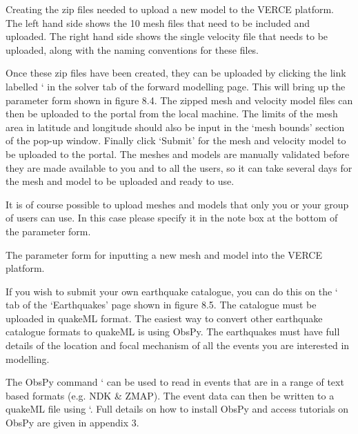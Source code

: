 \documentclass[english]{book}
\begin{document}

 Creating the zip files needed to upload a new model to
the VERCE platform. The left hand side shows the 10 mesh files that need
to be included and uploaded. The right hand side shows the single
velocity file that needs to be uploaded, along with the naming
conventions for these files.

Once these zip files have been created, they can be uploaded by clicking
the link labelled ‘ in the solver tab of the forward modelling page. This will
bring up the parameter form shown in figure 8.4. The zipped mesh and
velocity model files can then be uploaded to the portal from the local
machine. The limits of the mesh area in latitude and longitude should
also be input in the ‘mesh bounds’ section of the pop-up window. Finally
click ‘Submit’ for the mesh and velocity model to be uploaded to the
portal. The meshes and models are manually validated before they are
made available to you and to all the users, so it can take several days
for the mesh and model to be uploaded and ready to use.

It is of course possible to upload meshes and models that only you or
your group of users can use. In this case please specify it in the note
box at the bottom of the parameter form.


 The parameter form for inputting a new mesh and model
into the VERCE platform.


If you wish to submit your own earthquake catalogue, you can do this on
the ‘ tab of the ‘Earthquakes’ page shown in figure 8.5. The
catalogue must be uploaded in quakeML format. The easiest way to convert
other earthquake catalogue formats to quakeML is using ObsPy. The
earthquakes must have full details of the location and focal mechanism
of all the events you are interested in modelling.

The ObsPy command ‘ can be used to read in events that
are in a range of text based formats (e.g. NDK \& ZMAP). The event data
can then be written to a quakeML file using ‘. Full
details on how to install ObsPy and access tutorials on ObsPy are given
in appendix 3.
\end{document}
